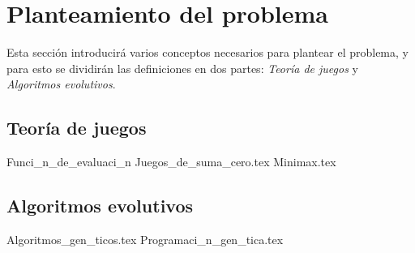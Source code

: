  
\section{Planteamiento del problema}
  Esta sección introducirá varios conceptos necesarios para plantear el problema, y para esto se 
  dividirán las definiciones en dos partes: \textit{Teoría de juegos} y \textit{Algoritmos 
  evolutivos}.
  
  \subsection{Teoría de juegos}    
    {Funci_n_de_evaluaci_n}
    {Juegos_de_suma_cero.tex}
    {Minimax.tex}
  
  \subsection{Algoritmos evolutivos}
    {Algoritmos_gen_ticos.tex}
    {Programaci_n_gen_tica.tex}
    
  